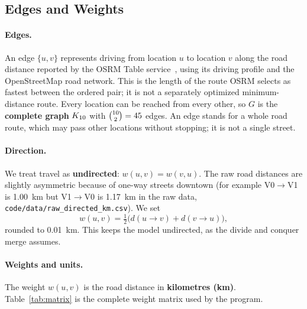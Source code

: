\subsection{Edges and Weights}\label{sec:edges}
\paragraph{Edges.} An edge $\{u, v\}$ represents driving from location $u$ to location $v$ along the
road distance reported by the OSRM Table service~\cite{osrmapi}, using its driving profile and the
OpenStreetMap road network. This is the length of the route OSRM selects as fastest between the ordered
pair; it is not a separately optimized minimum-distance route.
Every location can be reached from every other, so $G$ is the
\textbf{complete graph} $K_{10}$ with $\binom{10}{2} = 45$ edges. An edge stands
for a whole road route, which may pass other locations without stopping; it is not a single street.

\paragraph{Direction.} We treat travel as \textbf{undirected}: $w(u,v) = w(v,u)$. The raw road distances are
slightly asymmetric because of one-way streets downtown (for example V0$\to$V1 is 1.00~km but V1$\to$V0 is
1.17~km in the raw data, \texttt{code/data/raw\_directed\_km.csv}). We set
\[
  w(u,v) = \tfrac12\bigl(d(u\to v) + d(v\to u)\bigr),
\]
rounded to 0.01~km. This keeps the model undirected, as the divide and conquer merge assumes.

\paragraph{Weights and units.} The weight $w(u,v)$ is the road distance in \textbf{kilometres (km)}.
Table~\ref{tab:matrix} is the complete weight matrix used by the program.

\begin{table}[H]
\centering
\caption{Edge weights $w(i,j)$: undirected road distance in km. The matrix is symmetric.}\label{tab:matrix}
\vspace{4pt}
\small

\end{table}
